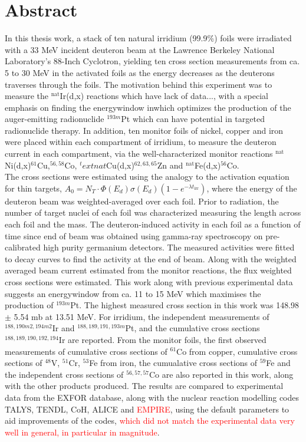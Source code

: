

\chapter{Abstract}
In this thesis work, a stack of ten natural irridium (99.9\%) foils were irradiated with a 33 MeV incident deuteron beam at the Lawrence Berkeley National Laboratory's 88-Inch Cyclotron, yielding ten cross section measurements from ca. 5 to 30 MeV in the activated foils as the energy decreases as the deuterons traverses through the foils. The motivation behind this experiment was to measure the $^\text{nat}$Ir(d,x) reactions which have lack of data..., with a special emphasis on finding the energywindow inwhich optimizes the production of the auger-emitting radionuclide $^{193m}$Pt which can have potential in targeted radionuclide therapy. In addition, ten monitor foils of nickel, copper and iron were placed within each compartment of irridium, to measure the deuteron current in each compartment, via the well-characterized monitor reactions $^\text{nat}$Ni(d,x)$
^{61}$Cu,$^{56,58}$Co, $^text{nat}$Cu(d,x)$^{62,63,65}$Zn and $^\text{nat}$Fe(d,x)$^{56}$Co.\\ 

The cross sections were estimated using the analogy to the activation equation for thin targets, $A_0 = N_T\cdot \Phi(E_d)\sigma(E_d)(1-e^{-\lambda t_\text{irr}})$, where the energy of the deuteron beam was weighted-averaged over each foil. Prior to radiation, the number of target nuclei of each foil was characterized measuring the length across each foil and the mass. The deuteron-induced activity in each foil as a function of time since end of beam was obtained using gamma-ray spectroscopy on pre-calibrated high purity germanium detectors. The measured activities were fitted to decay curves to find the activity at the end of beam. Along with the weighted averaged beam current estimated from the monitor reactions, the flux weighted cross sections were estimated. This work along with previous experimental data suggests an energywindow from ca. 11 to 15 MeV which maximises the production of $^{193m}$Pt. The highest measured cross section in this work was 148.98 $\pm$ 5.54 mb at 13.51 MeV. 
 For irridium, the independent measurements of $^{188,190m2, 194m2}$Ir and $^{188, 189, 191, 193m}$Pt, and the cumulative cross sections $^{188, 189, 190,192,194}$Ir are reported.  From the monitor foils, the first observed measurements of cumulative cross sections of $^{61}$Co from copper, cumulative cross sections of $^{48}$V, $^{51}$Cr, $^{53}$Fe from iron, the cumualative cross sections of $^{59}$Fe and the independent cross sections of $^{56,57,57}$Co are also reported in this work, along with the other products produced. The results are compared to experimental data from the EXFOR database, along with the nuclear reaction modelling codes TALYS, TENDL, CoH, ALICE and \textcolor{red}{EMPIRE}, using the default parameters to aid improvements of the codes, \textcolor{red}{which did not match the experimental data very well in general, in particular in magnitude}.  \\




